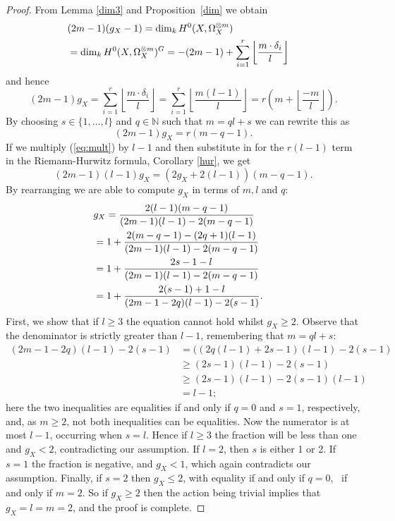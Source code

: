 \begin{proof}
    
    From Lemma \ref{dim3} and Proposition~\ref{dim} we obtain
        \begin{align*}
        \lefteqn{(2m-1)(g_X-1)=\dim_kH^0(X,\Omega_X^{\otimes m})} \\
        & =  \dim_kH^0(X,\Omega_X^{\otimes m})^G=-(2m-1)+\sum_{i=1}^r \left\lfloor \frac{m\cdot \delta_i}{l} \right\rfloor
        \end{align*}
    and hence
        \begin{equation*}
        (2m-1)g_X = \sum_{i=1}^r \left\lfloor \frac{m\cdot \delta_i}{l} \right\rfloor
        = \sum_{i=1}^r \left\lfloor \frac{m(l-1)}{l} \right\rfloor
        = r\left( m+\left\lfloor \frac{-m}{l} \right\rfloor \right).
        \end{equation*}
    By choosing $s\in \{1,\ldots ,l\}$ and $q\in \mathbb{N}$ such that $m=ql+s$ we can rewrite this as
        \begin{equation}\label{eq:mult}
        (2m-1)g_X=r(m-q-1).
        \end{equation}
    If we multiply (\ref{eq:mult}) by $l-1$ and then substitute in for the $r(l-1)$ term in the Riemann-Hurwitz formula, Corollary \ref{hur}, we get
        \begin{equation*}
        (2m-1)(l-1)g_X=(2g_X+2(l-1))(m-q-1).
        \end{equation*}
    By rearranging we are able to compute $g_X$ in terms of $m,l$ and $q$:
        \begin{align*}
        \lefteqn{g_X = \frac{2(l-1)(m-q-1)}{(2m-1)(l-1)-2(m-q-1)}} \\
        & =  1 + \frac{2(m-q-1)-(2q+1)(l-1)}{(2m-1)(l-1)-2(m-q-1)} \\
        & =  1 + \frac{2s-1-l}{(2m-1)(l-1)-2(m-q-1)}  \\
        & =  1 + \frac{2(s-1)+1-l}{(2m-1-2q)(l-1)-2(s-1)}. 
        \end{align*}
    First, we show that if $l\geq 3$ the equation cannot hold whilst $g_X\geq 2$.
    Observe that the denominator is strictly greater than $l-1$, remembering that $m=ql+s$:
        \begin{align*}
        (2m-1-2q)(l-1)-2(s-1) & =  ((2q(l-1)+2s-1)(l-1)-2(s-1) \\
        & \geq  (2s-1)(l-1)-2(s-1) \\
        & \geq  (2s-1)(l-1)-2(s-1)(l-1) \\
        & =  l-1;
        \end{align*}
    here the two inequalities are equalities if and only if $q=0$ and $s=1$, respectively, and, as $m\geq 2$, not both inequalities can be equalities.
    Now the numerator is at most $l-1$, occurring when $s=l$. 
    Hence if $l\geq 3$ the fraction will be less than one and $g_X < 2$, contradicting our assumption.
    If $l=2$, then $s$ is either 1 or 2.
    If $s=1$ the fraction is negative, and $g_X<1$, which again contradicts our assumption.
    Finally, if $s=2$ then $g_X\leq 2$, with equality if and only if $q=0$, \ie~if and only if $m=2$.
    So if $g_X \geq 2$ then the action being trivial implies that $g_X=l=m=2$, and the proof is complete.    
    \end{proof}

